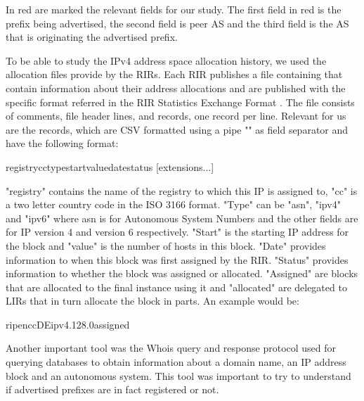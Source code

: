 \documentclass[11pt,a4paper]{scrreprt}
\begin{document}
\vspace{5mm}

In red are marked the relevant fields for our study. The first field in red is the prefix being advertised, the second field is peer AS and the third field is the AS that is originating the advertised prefix.

To be able to study the IPv4 address space allocation history, we used the allocation files \cite{Potaroo} provide by the RIRs. Each RIR publishes a file containing that contain information about their address allocations and are published with the specific format referred in the RIR Statistics Exchange Format \cite{ALLOC_FILES}. The file consists of comments, file header lines, and records,
one record per line. Relevant for us are the records, which are CSV formatted using a pipe "\textbar" as field separator and have the following format:
\vspace{5mm}

\hspace{1cm}	 registry\textbar cc\textbar type\textbar start\textbar value\textbar date\textbar status [\textbar extensions...]
	
\vspace{5mm}

"registry" contains the name of the registry to which this IP is assigned to, "cc" is a two letter country code in the ISO 3166 format. "Type" can be "asn", "ipv4" and "ipv6" where asn is for Autonomous System Numbers and the other fields are for IP version 4 and version 6 respectively. "Start" is the starting IP address for the block and "value" is the number of hosts in this block. "Date" provides information to when this block was first assigned by the RIR. "Status" provides information to whether the block was assigned or allocated. "Assigned" are blocks that are allocated to the final instance using it and "allocated" are delegated to LIRs that in turn allocate the block in parts. An example would be:
\vspace{5mm}

\hspace{1cm}	 ripencc\textbar DE\textbar ipv4.128.0\textbar assigned

\vspace{5mm}

Another important tool was the Whois \cite{Whois} query and response protocol used for querying databases to obtain information about a domain name, an IP address block and an autonomous system. This tool was important to try to understand if advertised prefixes are in fact registered or not.   
\end{document}
